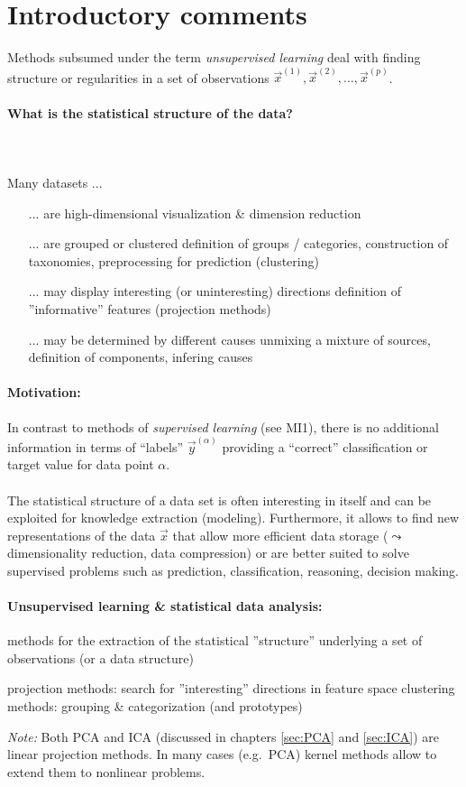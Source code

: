 \section{Introductory comments}

Methods subsumed under the term \emph{unsupervised learning} deal with
finding structure or regularities in a set of observations
$\vec{x}^{(1)}, \vec{x}^{(2)}, \ldots,\vec{x}^{(p)}$.


\paragraph{What is the statistical structure of the data?} \mbox{}\\\\
Many datasets ...
\begin{itemize}
\item[...] are high-dimensional \ra visualization \& dimension reduction
\item[...] are grouped or clustered \ra definition of groups / categories, construction of taxonomies, preprocessing for prediction (clustering)
\item[...] may display interesting (or uninteresting) directions \ra
  definition of ''informative'' features (projection methods)
\item[...] may be determined by different causes \ra unmixing a mixture of sources, definition
  of components, infering causes
\end{itemize}

\paragraph{Motivation:} 
In contrast to methods of \emph{supervised learning} (see MI1), there
is no additional information in terms of ``labels''
$\vec{y}^{(\alpha)}$ providing a ``correct'' classification or target
value for data point $\alpha$.
\\\\
The statistical structure of a data set is often interesting in itself
and can be exploited for knowledge extraction (modeling).
Furthermore, it allows to find new representations of the data
$\vec{x}$ that allow more efficient data storage ($\leadsto$
dimensionality reduction, data compression) or are better suited to
solve supervised problems such as prediction, classification,
reasoning, decision making.

\paragraph{Unsupervised learning \& statistical data analysis:}
methods for the extraction of the statistical ''structure'' underlying
a set of observations (or a data structure)
\begin{itemize}
	\itR projection methods: search for ''interesting'' directions in 
		feature space
	\itR clustering methods: grouping \& categorization (and prototypes)
\end{itemize}
\emph{Note:} Both PCA and ICA (discussed in chapters \ref{sec:PCA} and
\ref{sec:ICA}) are linear projection methods.  In many
cases (e.g.\ PCA) kernel methods allow to extend them to nonlinear
problems.
